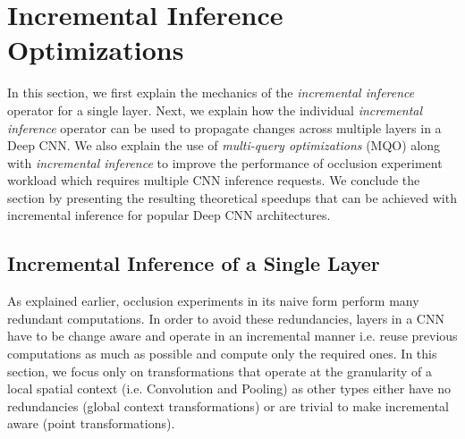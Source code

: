 \section{Incremental Inference Optimizations}\label{sec:optimizer}

In this section, we first explain the mechanics of the \textit{incremental inference} operator for a single layer.
Next, we explain how the individual \textit{incremental inference} operator can be used to propagate changes across multiple layers in a Deep CNN.
We also explain the use of \textit{multi-query optimizations} (MQO) along with \textit{incremental inference} to improve the performance of occlusion experiment workload which requires multiple CNN inference requests.
We conclude the section by presenting the resulting theoretical speedups that can be achieved with incremental inference for popular Deep CNN architectures.

\subsection{Incremental Inference of a Single Layer}\label{sec:inc_computation}
As explained earlier, occlusion experiments in its naive form perform many redundant computations.
In order to avoid these redundancies, layers in a CNN have to be change aware and operate in an incremental manner i.e. reuse previous computations as much as possible and compute only the required ones.
In this section, we focus only on transformations that operate at the granularity of a local spatial context (i.e. Convolution and Pooling) as other types either have no redundancies (global context transformations) or are trivial to make incremental aware (point transformations).

